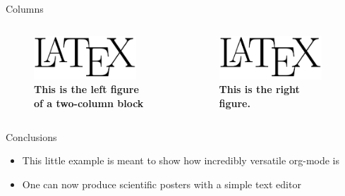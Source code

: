 \documentclass[final]{beamer}
\begin{document}
\begin{frame}[fragile,label={sec:org727f6f5}]{}
\begin{columns}
\begin{column}[t]{0.45\columnwidth}
\begin{block}{Columns}
\begin{columns}
\begin{column}[T]{0.48\columnwidth}
\captionsetup{justification=justified,width=.8\linewidth}
\begin{figure}[htbp]
\centering
\includegraphics[page=3,width=0.9\textwidth]{org-mode-poster-4.png}
\caption{\label{fig:org623938b}
\textbf{This is the left figure of a two-column block}}
\end{figure}
\end{column}

\begin{column}[T]{0.48\columnwidth}
\captionsetup{justification=justified,width=.8\linewidth}
\begin{figure}[htbp]
\centering
\includegraphics[page=9,width=0.9\textwidth]{org-mode-poster-4.png}
\caption{\label{fig:orgb76a1ef}
\textbf{This is the right figure.}}
\end{figure}
\end{column}
\end{columns}
\end{block}

\begin{block}{Conclusions}
\begin{itemize}
\item This little example is meant to show how incredibly versatile
org-mode is
\item One can now produce scientific posters with a simple text editor
\end{itemize}
\end{block}
\end{column}
\end{columns}
\end{frame}
\end{document}
